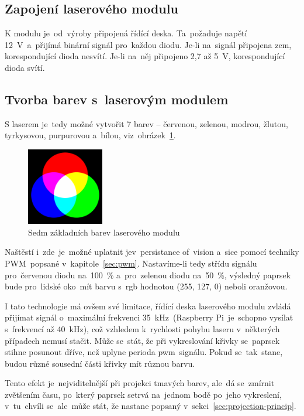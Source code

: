 \subsection{Zapojení laserového modulu}
K modulu je~od~výroby připojená řídící deska. Ta~požaduje napětí 12~V~a~přijímá binární signál pro~každou diodu. Je-li na~signál připojena zem, korespondující dioda nesvítí. Je-li na~něj připojeno 2,7 až 5~V, korespondující dioda svítí.

\subsection{Tvorba barev s~laserovým modulem}
S laserem je~tedy možné vytvořit 7 barev -- červenou, zelenou, modrou, žlutou, tyrkysovou, purpurovou a~bílou, viz~obrázek~\ref{fig:7colors}.

\begin{figure}[htb]
  \centering
  \includegraphics[width=0.3\textwidth]{img/7colors.png}
  \caption{\label{fig:7colors} Sedm základních barev laserového modulu}
\end{figure}

Naštěstí i~zde~je~možné uplatnit jev~persistance of~vision a~sice pomocí techniky PWM~popsané v~kapitole~\ref{sec:pwm}.
Nastavíme-li tedy střídu signálu pro~červenou diodu na~100~\% a~pro~zelenou diodu na~50~\%, výsledný paprsek bude pro~lidské oko~mít barvu s~rgb hodnotou (255, 127, 0) neboli oranžovou.

I tato technologie má ovšem své limitace, řídící deska laserového modulu zvládá přijímat signál o~maximální frekvenci 35~kHz~(Raspberry Pi~je~schopno vysílat s~frekvencí až 40~kHz), což vzhledem k~rychlosti pohybu laseru v~některých případech nemusí stačit.
Může se~stát, že při vykreslování křivky se~paprsek stihne posunout dříve, než uplyne perioda pwm~signálu. Pokud se~tak~stane, budou různé sousední části křivky mít různou barvu.


Tento efekt je~nejviditelnější při projekci tmavých barev, ale~dá se~zmírnit zvětšením času, po~který paprsek setrvá na~jednom bodě po~jeho vykreslení, v~tu~chvíli se~ale~může stát, že nastane  popsaný v~sekci~\ref{sec:projection-princip}.